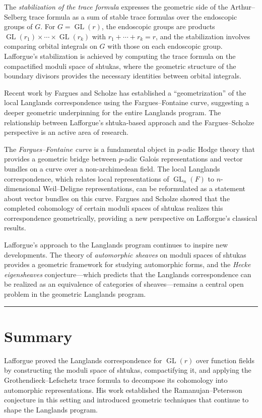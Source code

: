 The \emph{stabilization of the trace formula} expresses the geometric side of the Arthur--Selberg trace formula as a sum of stable trace formulas over the endoscopic groups of $G$. For $G = \operatorname{GL}(r)$, the endoscopic groups are products $\operatorname{GL}(r_1) \times \cdots \times \operatorname{GL}(r_k)$ with $r_1 + \cdots + r_k = r$, and the stabilization involves comparing orbital integrals on $G$ with those on each endoscopic group. Lafforgue's stabilization is achieved by computing the trace formula on the compactified moduli space of shtukas, where the geometric structure of the boundary divisors provides the necessary identities between orbital integrals.

Recent work by Fargues and Scholze has established a ``geometrization'' of the local Langlands correspondence using the Fargues--Fontaine curve, suggesting a deeper geometric underpinning for the entire Langlands program. The relationship between Lafforgue's shtuka-based approach and the Fargues--Scholze perspective is an active area of research.

The \emph{Fargues--Fontaine curve} is a fundamental object in $p$-adic Hodge theory that provides a geometric bridge between $p$-adic Galois representations and vector bundles on a curve over a non-archimedean field. The local Langlands correspondence, which relates local representations of $\operatorname{GL}_n(F)$ to $n$-dimensional Weil--Deligne representations, can be reformulated as a statement about vector bundles on this curve. Fargues and Scholze showed that the completed cohomology of certain moduli spaces of shtukas realizes this correspondence geometrically, providing a new perspective on Lafforgue's classical results.

Lafforgue's approach to the Langlands program continues to inspire new developments. The theory of \emph{automorphic sheaves} on moduli spaces of shtukas provides a geometric framework for studying automorphic forms, and the \emph{Hecke eigensheaves} conjecture---which predicts that the Langlands correspondence can be realized as an equivalence of categories of sheaves---remains a central open problem in the geometric Langlands program.

\begin{center}\rule{0.5\linewidth}{0.5pt}\end{center}

\section*{Summary}

Lafforgue proved the Langlands correspondence for $\operatorname{GL}(r)$ over function fields by constructing the moduli space of shtukas, compactifying it, and applying the Grothendieck--Lefschetz trace formula to decompose its cohomology into automorphic representations. His work established the Ramanujan--Petersson conjecture in this setting and introduced geometric techniques that continue to shape the Langlands program.
